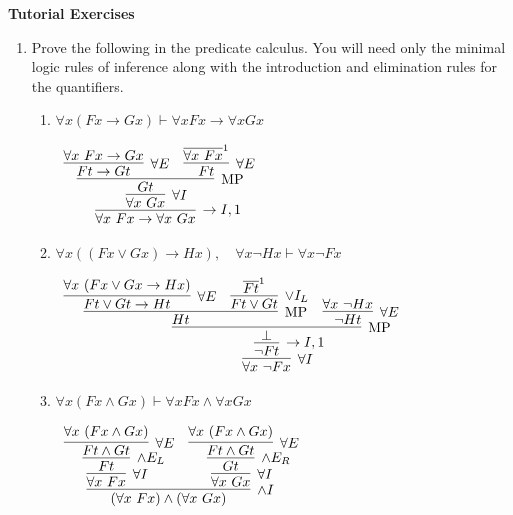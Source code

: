 \documentclass[11pt]{report}
\newcommand{\temp}[2]{{\overline{#2}}^{#1}}
\begin{document}
\newpage
{\bf Tutorial Exercises}
\begin{enumerate}
	
	\item Prove the following in the predicate calculus. You will need only the minimal logic rules of inference along with the introduction and elimination rules for the quantifiers.  

		\begin{enumerate}
			\item $\forall x (Fx \to Gx) \vdash  \forall x Fx \to \forall x Gx$
			
			\begin{center}
				$\begin{array}{c}
					\infer[\to I, 1]{\forall x \ Fx \to \forall x \ Gx}
						{\infer[\forall I]{\forall x \ Gx}
						{\infer[\MP]{Gt}
							{\infer[\forall E]{Ft \to Gt}
								{\forall x \ Fx \to Gx}
							&
							\infer[\forall E]{Ft}
								{\temp{1}{\forall x \ Fx}}}}}
				\end{array}$
			\end{center}
			
			\item $\forall x ((Fx \lor Gx) \to Hx),\quad \forall x \neg Hx \vdash  \forall x \neg Fx$
			
			\begin{center}
				$\begin{array}{c}
					\infer[\forall I]{\forall x \ \lnot Fx}
						{\infer[\to I,1]{\lnot Ft}
							{\infer[\MP]{\bot}
								{\infer[\MP]{Ht}
									{\infer[\forall E]{Ft \lor Gt \to Ht}
										{\forall x \ (Fx \lor Gx \to Hx)}
									&
									\infer[\lor I_{L}]{Ft \lor Gt}
										{\temp{1}{Ft}}}
								&
								\infer[\forall E]{\lnot Ht}
									{\forall x \ \lnot Hx}}}}
				\end{array}$
			\end{center}
			
			\item $\forall x (Fx\land Gx) \vdash  \forall x Fx\land \forall x Gx$
			
			\begin{center}
				$\begin{array}{c}
					\infer[\land I]{(\forall x \ Fx) \land (\forall x \ Gx)}
						{\infer[\forall I]{\forall x \ Fx}
							{\infer[\land E_{L}]{Ft}
								{\infer[\forall E]{Ft \land Gt}
									{\forall x \ (Fx \land Gx)}}}
						&
						\infer[\forall I]{\forall x \ Gx}
							{\infer[\land E_{R}]{Gt}
								{\infer[\forall E]{Ft \land Gt}
									{\forall x \ (Fx \land Gx)}}}}
				\end{array}$
			\end{center}
			

\end{enumerate}
\end{enumerate}
\end{document}
